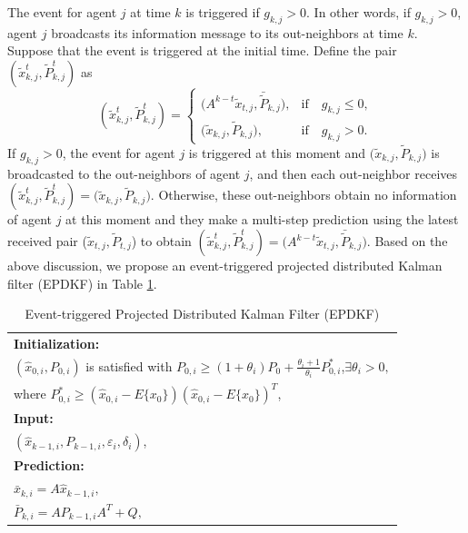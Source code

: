 \documentclass[journal,transmag]{IEEEtran}
\begin{document}
{	
	
	
	The event for agent $j$ at time $k$ is triggered if $ g_{k,j}> 0$. In other words, if $ g_{k,j}> 0$, agent $j$ broadcasts its information message to its out-neighbors at time $k$.
	Suppose that the event is triggered at the initial time.  Define the pair $(\tilde x_{k,j}^t,\tilde P_{k,j}^t)$ as
	\begin{equation}\label{estimates_lattest}
	(\tilde x_{k,j}^t,\tilde P_{k,j}^t)=
	\begin{cases}
	\big(A^{k-t}\tilde x_{t,j},\bar{\tilde{P}}_{k,j}\big),&\text{if}\quad  g_{k,j}\leq 0,\\
	\big(\tilde x_{k,j},\tilde P_{k,j}\big),&\text{if}\quad  g_{k,j}> 0.
	\end{cases}
	\end{equation}
	If $ g_{k,j}>0$, the event for agent $j$ is triggered at this moment and $\big(\tilde x_{k,j},\tilde P_{k,j}\big)$ is broadcasted to the out-neighbors of agent $j$, and then each out-neighbor receives $(\tilde x_{k,j}^t,\tilde P_{k,j}^t)=\big(\tilde x_{k,j},\tilde P_{k,j}\big)$. Otherwise, these out-neighbors obtain no information of agent $j$ at this moment and they make a multi-step prediction using the latest received pair  ($\tilde x_{t,j},\tilde P_{t,j}$) to obtain $(\tilde x_{k,j}^t,\tilde P_{k,j}^t)=\big(A^{k-t}\tilde x_{t,j},\bar{\tilde{P}}_{k,j}\big)$.
	Based on the above discussion,  we propose an event-triggered projected distributed Kalman filter (EPDKF) in Table \ref{ODKF3}.
	\begin{table}[htp]
		\caption{Event-triggered Projected Distributed Kalman Filter (EPDKF)}
		\label{ODKF3}	
		\centering  %
		\begin{tabular}{l}  %
			\hline\hline
			\textbf{Initialization:}\\
			{
			$(\hat x_{0,i},P_{0,i})$ is satisfied with $P_{0,i}\geq (1+\theta_i)P_0+\frac{\theta_i+1}{\theta_i}P_{0,i}^*$,$\exists \theta_i>0, $}\\
			{where $P_{0,i}^*\geq (\hat x_{0,i}-E\{x_0\})(\hat x_{0,i}-E\{x_0\})^T$,}\\
			\textbf{Input:}\\	
			$(\hat x_{k-1,i},P_{k-1,i},\varepsilon_i,\delta_i)$,  \\
			\textbf{Prediction:}\\
			$\bar x_{k,i}=A\hat x_{k-1,i},$\\  %
			$\bar P_{k,i}=AP_{k-1,i}A^T+Q,$\\         %

\end{tabular}
\end{table}}
\end{document}
